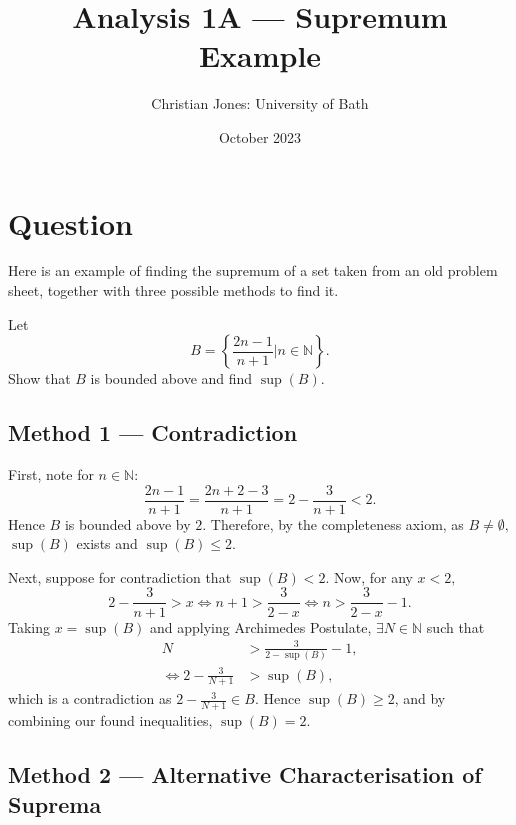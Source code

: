 \documentclass[
  12pt,
  a4paper]{extarticle}
\title{Analysis 1A --- Supremum Example}
\author{Christian Jones: University of Bath}
\date{October 2023}
\theoremstyle{plain}
\theoremstyle{definition}
\theoremstyle{plain}
\theoremstyle{plain}
\theoremstyle{plain}
\theoremstyle{plain}
\theoremstyle{definition}
\theoremstyle{definition}
\newtheorem*{Order Axioms*}{Order Axioms}\newtheorem{Order Axioms}{Order Axioms}[section]
\theoremstyle{remark}
\theoremstyle{remark}
\let\BeginKnitrBlock\begin \let\EndKnitrBlock\end
\renewcommand{\;}{\,}
\begin{document}
\maketitle

{
\setcounter{tocdepth}{2}
\tableofcontents
}
\newpage
{}

\hypertarget{question}{%
\section*{Question}\label{question}}

Here is an example of finding the supremum of a set taken from an old problem sheet, together with three possible methods to find it.
\BeginKnitrBlock{example}
{\label{exm:unnamed-chunk-2} }Let \[B = \left\lbrace \frac{2n-1}{n+1} \lvert n \in \mathbb{N}\right\rbrace.\] Show that \(B\) is bounded above and find \(\sup(B).\)
\EndKnitrBlock{example}

\hypertarget{method-1-contradiction}{%
\subsection*{Method 1 --- Contradiction}\label{method-1-contradiction}}

\BeginKnitrBlock{solution*}
First, note for \(n\in\mathbb{N}\): \[\frac{2n-1}{n+1} = \frac{2n+2-3}{n+1} = 2 - \frac{3}{n+1} < 2.\] Hence \(B\) is bounded above by \(2\). Therefore, by the completeness axiom, as \(B \neq \emptyset,\) \(\sup(B)\) exists and \(\sup(B) \leq 2.\)

Next, suppose for contradiction that \(\sup(B) < 2\). Now, for any \(x < 2,\) \[2 - \frac{3}{n+1} > x \Leftrightarrow n+1 > \frac{3}{2-x} \Leftrightarrow n > \frac{3}{2-x} - 1.\] Taking \(x = \sup(B)\) and applying Archimedes Postulate, \(\exists N \in \mathbb{N}\) such that
\begin{align*}
N &> \frac{3}{2-\sup(B)} - 1,\\
\Leftrightarrow 2 - \frac{3}{N+1} &> \sup(B),
\end{align*}
which is a contradiction as \(2 - \frac{3}{N+1} \in B.\) Hence \(\sup(B) \geq 2\), and by combining our found inequalities, \(\sup(B)=2\).
\EndKnitrBlock{solution*}

\hypertarget{method-2-alternative-characterisation-of-suprema}{%
\subsection*{Method 2 --- Alternative Characterisation of Suprema}\label{method-2-alternative-characterisation-of-suprema}}
\end{document}
